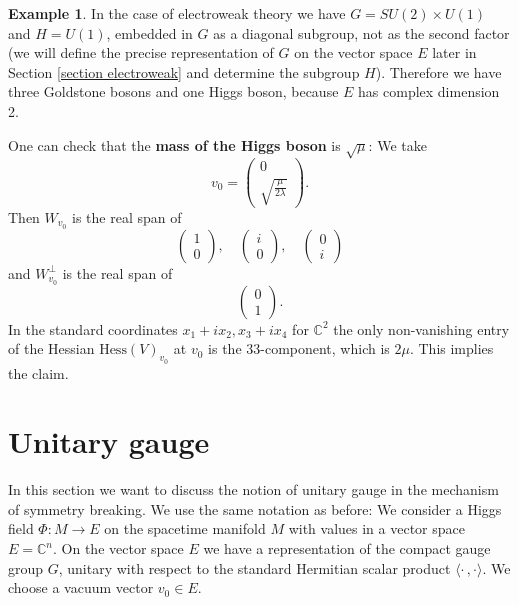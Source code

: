 \documentclass[11pt]{amsart}
\theoremstyle{definition}
\newtheorem{ex}[thm]{Example}
\theoremstyle{remark}
\numberwithin{equation}{section}
\begin{document}
\begin{ex}\label{ex Higgs mass} In the case of electroweak theory we have $G=SU(2)\times U(1)$ and $H=U(1)$, embedded in $G$ as a diagonal subgroup, not as the second factor (we will define the precise representation of $G$ on the vector space $E$ later in Section \ref{section electroweak} and determine the subgroup $H$). Therefore we have three Goldstone bosons and one Higgs boson, because $E$ has complex dimension 2. 

One can check that the {\bf mass of the Higgs boson} is $\sqrt{\mu}$: We take
\begin{equation*}
v_0=\left(\begin{array}{c}0\\\sqrt{\frac{\mu}{2\lambda}} \end{array}\right).
\end{equation*}
Then $W_{v_0}$ is the real span of 
\begin{equation*}
\left(\begin{array}{c}1\\0\end{array}\right),\quad \left(\begin{array}{c}i\\0\end{array}\right),\quad\left(\begin{array}{c}0\\ i\end{array}\right)
\end{equation*}
and $W_{v_0}^\perp$ is the real span of 
\begin{equation*}
\left(\begin{array}{c}0\\1\end{array}\right).
\end{equation*}
In the standard coordinates $x_1+ix_2,x_3+ix_4$ for $\mathbb{C}^2$ the only non-vanishing entry of the Hessian $\mathrm{Hess}(V)_{v_0}$ at $v_0$ is the $33$-component, which is $2\mu$. This implies the claim.
\end{ex}




\section{Unitary gauge}\label{sect unitary gauge}

In this section we want to discuss the notion of unitary gauge in the mechanism of symmetry breaking. We use the same notation as before: We consider a Higgs field $\Phi\colon M\rightarrow E$ on the spacetime manifold $M$ with values in a vector space $E=\mathbb{C}^n$. On the vector space $E$ we have a representation of the compact gauge group $G$, unitary with respect to the standard Hermitian scalar product $\langle\cdot\,,\cdot\rangle$. We choose a vacuum vector $v_0\in E$.
\end{document}
